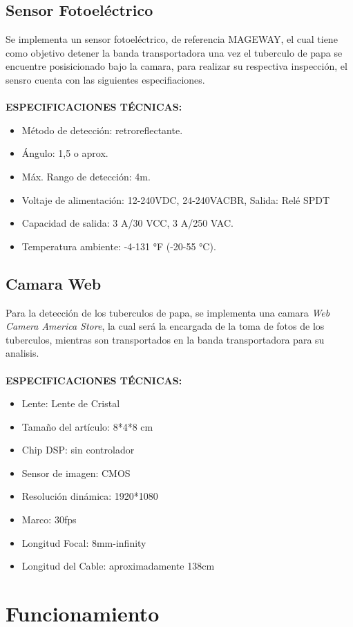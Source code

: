 		\subsection{Sensor Fotoeléctrico}
			Se implementa un sensor fotoeléctrico, de referencia MAGEWAY, el cual tiene como objetivo detener la banda transportadora una vez el tuberculo de papa se encuentre posisicionado bajo la camara, para realizar su respectiva inspección, el sensro cuenta con las siguientes especifiaciones.
			\\
			\\
			\textbf{ESPECIFICACIONES TÉCNICAS:}
				\begin{itemize}
					\item Método de detección: retroreflectante.
					\item Ángulo: 1,5 o aprox.
					\item Máx. Rango de detección: 4m.
					\item Voltaje de alimentación: 12-240VDC, 24-240VACBR, Salida: Relé SPDT
					\item Capacidad de salida: 3 A/30 VCC, 3 A/250 VAC.
					\item Temperatura ambiente: -4-131 °F (-20-55 °C).
				\end{itemize}
\newpage			
		\subsection{Camara Web}
			Para la detección de los tuberculos de papa, se implementa una camara \textit{Web Camera America Store}, la cual será la encargada de la toma de fotos de los tuberculos, mientras son transportados en la banda transportadora para su analisis.
			\\
			\\
			\textbf{ESPECIFICACIONES TÉCNICAS:}
			\begin{itemize}
				\item Lente: Lente de Cristal
				\item Tamaño del artículo: 8*4*8 cm
				\item Chip DSP: sin controlador
				\item Sensor de imagen: CMOS
				\item Resolución dinámica: 1920*1080
				\item Marco: 30fps
				\item Longitud Focal: 8mm-infinity
				\item Longitud del Cable: aproximadamente 138cm
			\end{itemize}
			
	\section{Funcionamiento}
		













